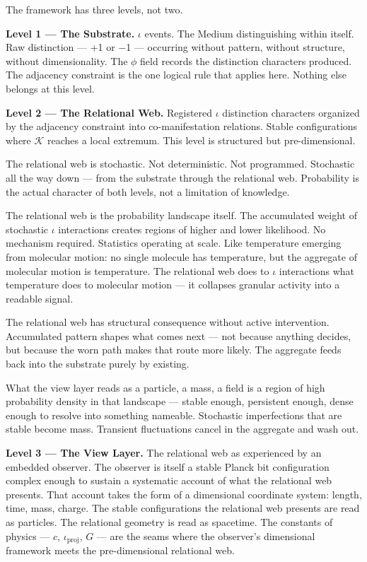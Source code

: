 \documentclass[11pt,letterpaper]{article}
\newcommand{\Kappa}{\mathcal{K}}
\begin{document}
The framework has three levels, not two.

\textbf{Level 1 --- The Substrate.} \(\iota\) events. The Medium distinguishing within itself. Raw distinction --- +1 or −1 --- occurring without pattern, without structure, without dimensionality. The \(\phi\) field records the distinction characters produced. The adjacency constraint is the one logical rule that applies here. Nothing else belongs at this level.

\textbf{Level 2 --- The Relational Web.} Registered \(\iota\) distinction characters organized by the adjacency constraint into co-manifestation relations. Stable configurations where \(\Kappa\) reaches a local extremum. This level is structured but pre-dimensional.

The relational web is stochastic. Not deterministic. Not programmed. Stochastic all the way down --- from the substrate through the relational web. Probability is the actual character of both levels, not a limitation of knowledge.

The relational web is the probability landscape itself. The accumulated weight of stochastic \(\iota\) interactions creates regions of higher and lower likelihood. No mechanism required. Statistics operating at scale. Like temperature emerging from molecular motion: no single molecule has temperature, but the aggregate of molecular motion is temperature. The relational web does to \(\iota\) interactions what temperature does to molecular motion --- it collapses granular activity into a readable signal.

The relational web has structural consequence without active intervention. Accumulated pattern shapes what comes next --- not because anything decides, but because the worn path makes that route more likely. The aggregate feeds back into the substrate purely by existing.

What the view layer reads as a particle, a mass, a field is a region of high probability density in that landscape --- stable enough, persistent enough, dense enough to resolve into something nameable. Stochastic imperfections that are stable become mass. Transient fluctuations cancel in the aggregate and wash out.

\textbf{Level 3 --- The View Layer.} The relational web as experienced by an embedded observer. The observer is itself a stable Planck bit configuration complex enough to sustain a systematic account of what the relational web presents. That account takes the form of a dimensional coordinate system: length, time, mass, charge. The stable configurations the relational web presents are read as particles. The relational geometry is read as spacetime. The constants of physics --- \(c\), \(\iota_{\mathrm{proj}}\), \(G\) --- are the seams where the observer's dimensional framework meets the pre-dimensional relational web.
\end{document}
